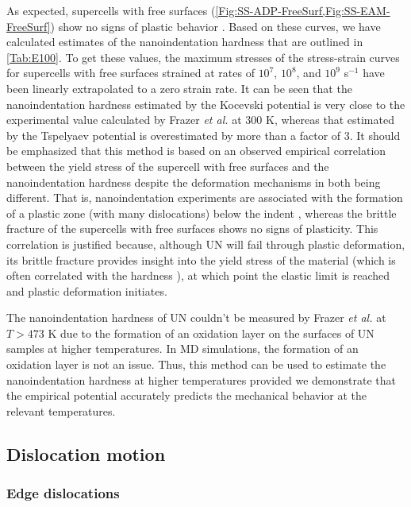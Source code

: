 \documentclass[applsci,article,submit,pdftex,moreauthors]{Definitions/mdpi}
\newcommand{\?}{\stackrel{?}{=}}
\begin{document}
As expected, supercells with free surfaces (\cref{Fig:SS-ADP-FreeSurf,Fig:SS-EAM-FreeSurf}) show no signs of plastic behavior \cite{Ivashchenko2007}. Based on these curves, we have calculated estimates of the nanoindentation hardness that are outlined in \cref{Tab:E100}. To get these values, the maximum stresses of the stress-strain curves for supercells with free surfaces strained at rates of $10^7$, $10^8$, and $10^9$ s$^{-1}$ have been linearly extrapolated to a zero strain rate. It can be seen that the nanoindentation hardness estimated by the Kocevski potential is very close to the experimental value calculated by Frazer \textit{et al.} \cite{Frazer2021} at 300 K, whereas that estimated by the Tspelyaev potential is overestimated by more than a factor of 3. It should be emphasized that this method is based on an observed empirical correlation between the yield stress of the supercell with free surfaces and the nanoindentation hardness despite the deformation mechanisms in both being different. That is, nanoindentation experiments are associated with the formation of a plastic zone (with many dislocations) below the indent \cite{Adachi2009}, whereas the brittle fracture of the supercells with free surfaces shows no signs of plasticity. This correlation is justified because, although UN will fail through plastic deformation, its brittle fracture provides insight into the yield stress of the material \cite{Taylor2008} (which is often correlated with the hardness \cite{Meyers2009}), at which point the elastic limit is reached and plastic deformation initiates.

The nanoindentation hardness of UN couldn't be measured by Frazer \textit{et al.} \cite{Frazer2021} at $T > 473$ K due to the formation of an oxidation layer on the surfaces of UN samples at higher temperatures. In MD simulations, the formation of an oxidation layer is not an issue. Thus, this method can be used to estimate the nanoindentation hardness at higher temperatures provided we demonstrate that the empirical potential accurately predicts the mechanical behavior at the relevant temperatures.

\subsection{Dislocation motion}
\label{Sec:DislocMotion}

\subsubsection{Edge dislocations}
\end{document}
